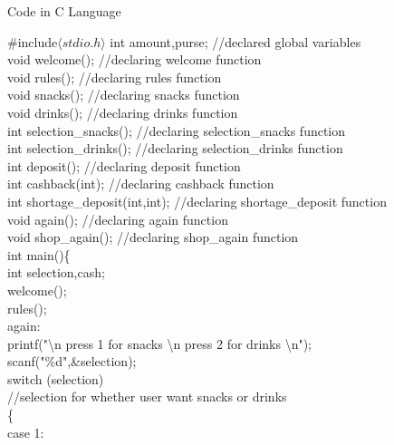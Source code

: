 \documentclass[10pt,a4paper]{article}
\begin{document}
\begin{flushleft}
\begin{center}
\end{center}
\newpage
\begin{center}
Code in C Language
\end{center}
\#include$\langle stdio.h \rangle$
int amount,purse; //declared global variables \\
void welcome(); //declaring welcome function\\
void rules(); //declaring rules function \\
void snacks(); //declaring snacks function\\
void drinks(); //declaring drinks function\\
int selection\_snacks(); //declaring selection\_snacks function\\
int selection\_drinks(); //declaring selection\_drinks function\\
int deposit(); //declaring deposit function\\
int cashback(int); //declaring cashback function\\
int shortage\_deposit(int,int); //declaring shortage\_deposit function\\
void again(); //declaring again function\\
void shop\_again(); //declaring shop\_again function\\
\bigskip
int main()\{\\
    \hspace*{0.5cm}  int selection,cash;\\
    \hspace*{0.5cm}  welcome();\\
    \hspace*{0.5cm}  rules();\\
    \hspace*{0.5cm}  again:\\
    \hspace*{0.5cm}  printf("\textbackslash n press 1 for snacks \textbackslash n press 2 for drinks \textbackslash n");\\
    \hspace*{0.5cm}  scanf("\%d",\&selection);\\
    \hspace*{0.5cm}  switch (selection)\\   //selection for whether user want snacks or drinks\\
    \hspace*{0.5cm}  \{\\
    \hspace*{0.5cm}  case 1:\\

\end{flushleft}
\end{document}
